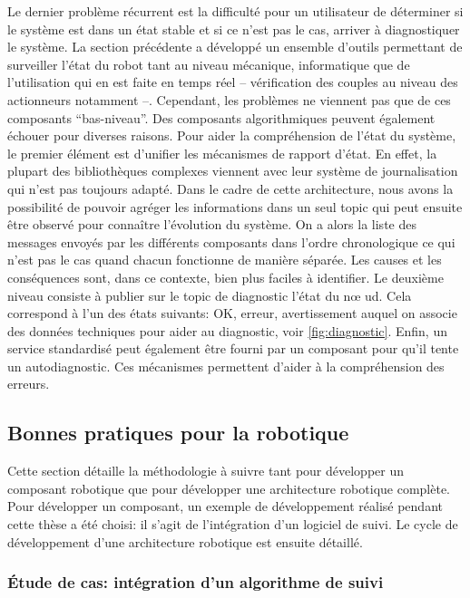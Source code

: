 Le dernier problème récurrent est la difficulté pour un utilisateur de
déterminer si le système est dans un état stable et si ce n'est pas le
cas, arriver à diagnostiquer le système. La section précédente a
développé un ensemble d'outils permettant de surveiller l'état du
robot tant au niveau mécanique, informatique que de l'utilisation qui
en est faite en temps réel -- vérification des couples au niveau des
actionneurs notamment --. Cependant, les problèmes ne viennent pas que
de ces composants ``bas-niveau''. Des composants algorithmiques
peuvent également échouer pour diverses raisons. Pour aider la
compréhension de l'état du système, le premier élément est d'unifier
les mécanismes de rapport d'état. En effet, la plupart des
bibliothèques complexes viennent avec leur système de journalisation
qui n'est pas toujours adapté. Dans le cadre de cette architecture,
nous avons la possibilité de pouvoir agréger les informations dans un
seul topic qui peut ensuite être observé pour connaître l'évolution du
système. On a alors la liste des messages envoyés par les différents
composants dans l'ordre chronologique ce qui n'est pas le cas quand
chacun fonctionne de manière séparée. Les causes et les conséquences
sont, dans ce contexte, bien plus faciles à identifier. Le deuxième
niveau consiste à publier sur le topic de diagnostic l'état du n\oe
ud. Cela correspond à l'un des états suivants: OK, erreur,
avertissement auquel on associe des données techniques pour aider au
diagnostic, voir \autoref{fig:diagnostic}. Enfin, un service
standardisé peut également être fourni par un composant pour qu'il
tente un autodiagnostic. Ces mécanismes permettent d'aider à la
compréhension des erreurs.



\subsection{Bonnes pratiques pour la robotique}

Cette section détaille la méthodologie à suivre tant pour développer
un composant robotique que pour développer une architecture robotique
complète. Pour développer un composant, un exemple de développement
réalisé pendant cette thèse a été choisi: il s'agit de l'intégration
d'un logiciel de suivi. Le cycle de développement d'une architecture robotique est ensuite détaillé.


\subsubsection{Étude de cas: intégration d'un algorithme de suivi}

